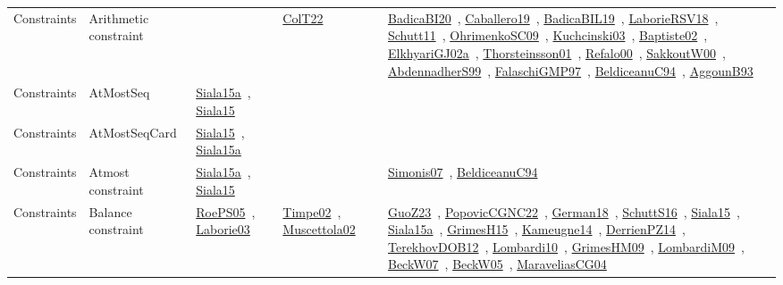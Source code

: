 {\begin{longtable}{lp{3cm}>{\raggedright\arraybackslash}p{6cm}>{\raggedright\arraybackslash}p{6cm}>{\raggedright\arraybackslash}p{8cm}}
Constraints & Arithmetic constraint &  & \href{../works/ColT22.pdf}{ColT22}~\cite{ColT22} & \href{../works/BadicaBI20.pdf}{BadicaBI20}~\cite{BadicaBI20}, \href{../works/Caballero19.pdf}{Caballero19}~\cite{Caballero19}, \href{../works/BadicaBIL19.pdf}{BadicaBIL19}~\cite{BadicaBIL19}, \href{../works/LaborieRSV18.pdf}{LaborieRSV18}~\cite{LaborieRSV18}, \href{../works/Schutt11.pdf}{Schutt11}~\cite{Schutt11}, \href{../works/OhrimenkoSC09.pdf}{OhrimenkoSC09}~\cite{OhrimenkoSC09}, \href{../works/Kuchcinski03.pdf}{Kuchcinski03}~\cite{Kuchcinski03}, \href{../works/Baptiste02.pdf}{Baptiste02}~\cite{Baptiste02}, \href{../works/ElkhyariGJ02a.pdf}{ElkhyariGJ02a}~\cite{ElkhyariGJ02a}, \href{../works/Thorsteinsson01.pdf}{Thorsteinsson01}~\cite{Thorsteinsson01}, \href{../works/Refalo00.pdf}{Refalo00}~\cite{Refalo00}, \href{../works/SakkoutW00.pdf}{SakkoutW00}~\cite{SakkoutW00}, \href{../works/AbdennadherS99.pdf}{AbdennadherS99}~\cite{AbdennadherS99}, \href{../works/FalaschiGMP97.pdf}{FalaschiGMP97}~\cite{FalaschiGMP97}, \href{../works/BeldiceanuC94.pdf}{BeldiceanuC94}~\cite{BeldiceanuC94}, \href{../works/AggounB93.pdf}{AggounB93}~\cite{AggounB93}\\
Constraints & AtMostSeq & \href{../works/Siala15a.pdf}{Siala15a}~\cite{Siala15a}, \href{../works/Siala15.pdf}{Siala15}~\cite{Siala15} &  & \\
Constraints & AtMostSeqCard & \href{../works/Siala15.pdf}{Siala15}~\cite{Siala15}, \href{../works/Siala15a.pdf}{Siala15a}~\cite{Siala15a} &  & \\
Constraints & Atmost constraint & \href{../works/Siala15a.pdf}{Siala15a}~\cite{Siala15a}, \href{../works/Siala15.pdf}{Siala15}~\cite{Siala15} &  & \href{../works/Simonis07.pdf}{Simonis07}~\cite{Simonis07}, \href{../works/BeldiceanuC94.pdf}{BeldiceanuC94}~\cite{BeldiceanuC94}\\
Constraints & Balance constraint & \href{../works/RoePS05.pdf}{RoePS05}~\cite{RoePS05}, \href{../works/Laborie03.pdf}{Laborie03}~\cite{Laborie03} & \href{../works/Timpe02.pdf}{Timpe02}~\cite{Timpe02}, \href{../works/Muscettola02.pdf}{Muscettola02}~\cite{Muscettola02} & \href{../works/GuoZ23.pdf}{GuoZ23}~\cite{GuoZ23}, \href{../works/PopovicCGNC22.pdf}{PopovicCGNC22}~\cite{PopovicCGNC22}, \href{../works/German18.pdf}{German18}~\cite{German18}, \href{../works/SchuttS16.pdf}{SchuttS16}~\cite{SchuttS16}, \href{../works/Siala15.pdf}{Siala15}~\cite{Siala15}, \href{../works/Siala15a.pdf}{Siala15a}~\cite{Siala15a}, \href{../works/GrimesH15.pdf}{GrimesH15}~\cite{GrimesH15}, \href{../works/Kameugne14.pdf}{Kameugne14}~\cite{Kameugne14}, \href{../works/DerrienPZ14.pdf}{DerrienPZ14}~\cite{DerrienPZ14}, \href{../works/TerekhovDOB12.pdf}{TerekhovDOB12}~\cite{TerekhovDOB12}, \href{../works/Lombardi10.pdf}{Lombardi10}~\cite{Lombardi10}, \href{../works/GrimesHM09.pdf}{GrimesHM09}~\cite{GrimesHM09}, \href{../works/LombardiM09.pdf}{LombardiM09}~\cite{LombardiM09}, \href{../works/BeckW07.pdf}{BeckW07}~\cite{BeckW07}, \href{../works/BeckW05.pdf}{BeckW05}~\cite{BeckW05}, \href{../works/MaraveliasCG04.pdf}{MaraveliasCG04}~\cite{MaraveliasCG04}\\

\end{longtable}}
